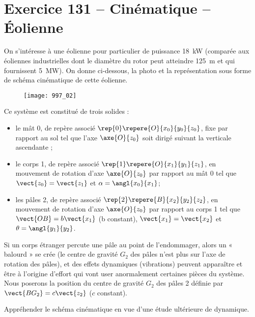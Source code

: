 \section*{Exercice 131 -- Cinématique -- Éolienne}
\setcounter{exo}{0}

On s'intéresse à une éolienne pour particulier de puissance \SI{18}{kW} (comparée aux éoliennes
industrielles dont le diamètre du rotor peut atteindre \SI{125}{m} et qui fournissent \SI{5}{MW}).
On donne ci-dessous, la photo et la représentation sous forme de schéma cinématique de cette éolienne.



\begin{figure}[H]
\centering
\texttt{[image: 997\_02]}
\end{figure}

Ce système est constitué de trois solides :
\begin{itemize}
\item le mât 0, de repère associé  $\rep{0}\repere{O}{x_0}{y_0}{z_0}$, fixe par rapport au sol tel que l’axe $\axe{O}{z_0}$  soit dirigé suivant la verticale ascendante ;
\item le corps 1, de repère associé   $\rep{1}\repere{O}{x_1}{y_1}{z_1}$, en mouvement de rotation d’axe $\axe{O}{z_0}$  par rapport au mât 0 tel que $\vect{z_0}=\vect{z_1}$ et $\alpha = \angl{x_0}{x_1}$;
\item les pâles 2, de repère associé $\rep{2}\repere{B}{x_2}{y_2}{z_2}$, en mouvement de rotation d’axe $\axe{O}{z_0}$ par rapport au corps 1 tel que $\vect{OB}=b\vect{x_1}$ (b constant), $\vect{x_1}=\vect{x_2}$ et $\theta = \angl{y_1}{y_2}$.
\end{itemize}
Si un corps étranger percute une pâle au point de l'endommager, alors un « balourd » se crée (le centre de gravité $G_2$ des
pâles n’est plus sur l’axe de rotation des pâles), et des effets dynamiques (vibrations) peuvent apparaître et être à l’origine
d’effort qui vont user anormalement certaines pièces du système.
Nous poserons la position du centre de gravité $G_2$ des pâles 2 définie par $\vect{BG_2}=c\vect{z_2}$ ($c$ constant).

 \begin{obj}
Appréhender le schéma cinématique en vue d’une étude ultérieure de dynamique.
 \end{obj}



